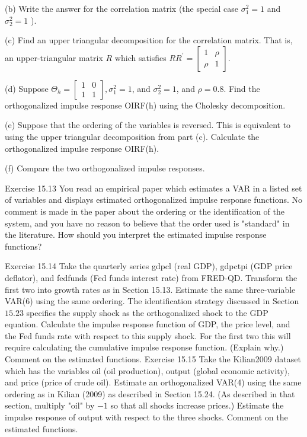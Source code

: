 \documentclass[10pt]{article}
\begin{document}
(b) Write the answer for the correlation matrix (the special case $\sigma_{1}^{2}=1$ and $\sigma_{2}^{2}=1$ ).

(c) Find an upper triangular decomposition for the correlation matrix. That is, an upper-triangular matrix $R$ which satisfies $R R^{\prime}=\left[\begin{array}{ll}1 & \rho \\ \rho & 1\end{array}\right]$.

(d) Suppose $\Theta_{h}=\left[\begin{array}{ll}1 & 0 \\ 1 & 1\end{array}\right], \sigma_{1}^{2}=1$, and $\sigma_{2}^{2}=1$, and $\rho=0.8$. Find the orthogonalized impulse response OIRF(h) using the Cholesky decomposition.

(e) Suppose that the ordering of the variables is reversed. This is equivalent to using the upper triangular decomposition from part (c). Calculate the orthogonalized impulse response OIRF(h).

(f) Compare the two orthogonalized impulse responses.

Exercise 15.13 You read an empirical paper which estimates a VAR in a listed set of variables and displays estimated orthogonalized impulse response functions. No comment is made in the paper about the ordering or the identification of the system, and you have no reason to believe that the order used is "standard" in the literature. How should you interpret the estimated impulse response functions?

Exercise 15.14 Take the quarterly series gdpcl (real GDP), gdpctpi (GDP price deflator), and fedfunds (Fed funds interest rate) from FRED-QD. Transform the first two into growth rates as in Section 15.13. Estimate the same three-variable VAR(6) using the same ordering. The identification strategy discussed in Section $15.23$ specifies the supply shock as the orthogonalized shock to the GDP equation. Calculate the impulse response function of GDP, the price level, and the Fed funds rate with respect to this supply shock. For the first two this will require calculating the cumulative impulse response function. (Explain why.) Comment on the estimated functions. Exercise 15.15 Take the Kilian2009 dataset which has the variables oil (oil production), output (global economic activity), and price (price of crude oil). Estimate an orthogonalized VAR(4) using the same ordering as in Kilian (2009) as described in Section 15.24. (As described in that section, multiply "oil" by $-1$ so that all shocks increase prices.) Estimate the impulse response of output with respect to the three shocks. Comment on the estimated functions.
\end{document}
